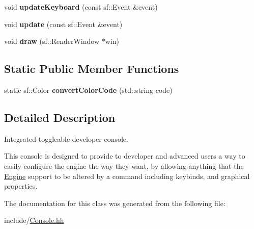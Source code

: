 \begin{DoxyCompactItemize}
\item 
void {\bfseries update\+Keyboard} (const sf\+::\+Event \&event)\hypertarget{classConsole_a5d3acb9de22bb5de6475431cb7dfa4e9}{}\label{classConsole_a5d3acb9de22bb5de6475431cb7dfa4e9}

\item 
void {\bfseries update} (const sf\+::\+Event \&event)\hypertarget{classConsole_aa5303865edd868a23c7cf77795bc9d4e}{}\label{classConsole_aa5303865edd868a23c7cf77795bc9d4e}

\item 
void {\bfseries draw} (sf\+::\+Render\+Window $\ast$win)\hypertarget{classConsole_a3521a7d331b2224e2034b079caeed4c2}{}\label{classConsole_a3521a7d331b2224e2034b079caeed4c2}

\end{DoxyCompactItemize}
\subsection*{Static Public Member Functions}
\begin{DoxyCompactItemize}
\item 
static sf\+::\+Color {\bfseries convert\+Color\+Code} (std\+::string code)\hypertarget{classConsole_a59e327394fba9e47ce1d83b46a86bb89}{}\label{classConsole_a59e327394fba9e47ce1d83b46a86bb89}

\end{DoxyCompactItemize}


\subsection{Detailed Description}
Integrated toggleable developer console. 

This console is designed to provide to developer and advanced users a way to easily configure the engine the way they want, by allowing anything that the \hyperlink{classEngine}{Engine} support to be altered by a command including keybinds, and graphical properties. 

The documentation for this class was generated from the following file\+:\begin{DoxyCompactItemize}
\item 
include/\hyperlink{Console_8hh}{Console.\+hh}\end{DoxyCompactItemize}
